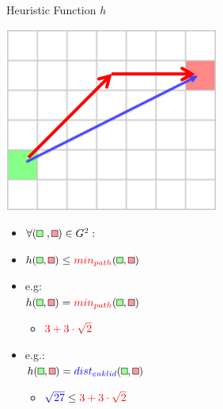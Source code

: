 \documentclass{presentation}
\newcommand{\rect}[1]{\tikz{\path[draw=black,fill=#1] (0,0) rectangle (2mm,2mm);}}
\newcommand{\grect}{\rect{white!60!green}}
\newcommand{\rrect}{\rect{white!60!red}}
\begin{document}
\begin{frame}{Heuristic Function $h$}
	\begin{minipage}{0.3\textwidth}
		\includegraphics[width=\textwidth]{figures/heuristic.png}
	\end{minipage}%
	\hfill%
	\begin{minipage}{0.6\textwidth}
		\begin{itemize}
		\item $\forall (\grect\ , \rrect)\in G^2:$
		\item $h(\grect, \rrect)\leq {\color{red}min_{path}}(\grect,\rrect)$
		\pause
		\item e.g:\\ $h(\grect, \rrect) = {\color{red}min_{path}}(\grect,\rrect)$
				\begin{itemize}
			\item ${\color{red}3+3\cdot\sqrt{2}}$
		\end{itemize}
		\pause
		\item e.g.:\\ $h(\grect, \rrect) = {\color{blue}dist_{euklid}}(\grect,\rrect)$
		\begin{itemize}
			\item ${\color{blue}\sqrt{27}} \leq {\color{red}3+3\cdot\sqrt{2}}$
		\end{itemize}
		\end{itemize}
	\end{minipage}
\end{frame}
\end{document}

